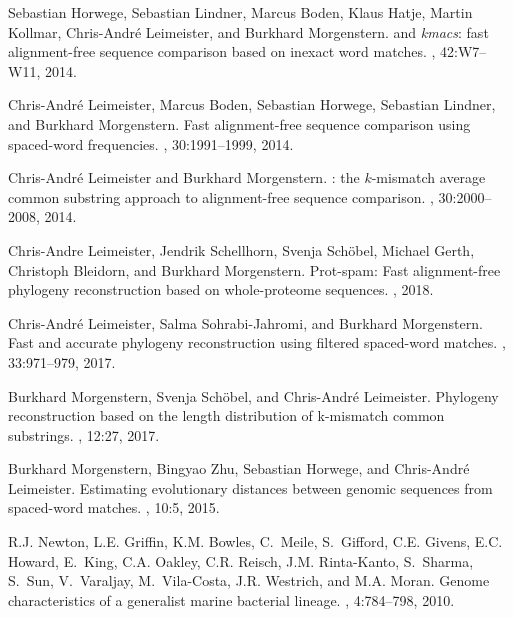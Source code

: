 \documentclass[review]{elsarticle}
\begin{document}
{\begin{thebibliography}{10}
Sebastian Horwege, Sebastian Lindner, Marcus Boden, Klaus Hatje, Martin
  Kollmar, Chris-Andr\'{e} Leimeister, and Burkhard Morgenstern.
 and {\it kmacs}: fast alignment-free sequence
  comparison based on inexact word matches.
, 42:W7--W11, 2014.

Chris-Andr{\'e} Leimeister, Marcus Boden, Sebastian Horwege, Sebastian Lindner,
  and Burkhard Morgenstern.
\newblock Fast alignment-free sequence comparison using spaced-word
  frequencies.
, 30:1991--1999, 2014.

Chris-Andr{\'e} Leimeister and Burkhard Morgenstern.
: the $k$-mismatch average common substring approach to
  alignment-free sequence comparison.
, 30:2000--2008, 2014.

Chris-Andre Leimeister, Jendrik Schellhorn, Svenja Sch{\"o}bel, Michael Gerth,
  Christoph Bleidorn, and Burkhard Morgenstern.
\newblock Prot-spam: Fast alignment-free phylogeny reconstruction based on
  whole-proteome sequences.
, 2018.

Chris-Andr{\'e} Leimeister, Salma Sohrabi-Jahromi, and Burkhard Morgenstern.
\newblock Fast and accurate phylogeny reconstruction using filtered spaced-word
  matches.
, 33:971--979, 2017.

Burkhard Morgenstern, Svenja Sch{\"o}bel, and Chris-Andr{\'e} Leimeister.
\newblock Phylogeny reconstruction based on the length distribution of
  k-mismatch common substrings.
, 12:27, 2017.

Burkhard Morgenstern, Bingyao Zhu, Sebastian Horwege, and Chris-Andr{\'e}
  Leimeister.
\newblock Estimating evolutionary distances between genomic sequences from
  spaced-word matches.
, 10:5, 2015.

R.J. Newton, L.E. Griffin, K.M. Bowles, C.~Meile, S.~Gifford, C.E. Givens, E.C.
  Howard, E.~King, C.A. Oakley, C.R. Reisch, J.M. Rinta-Kanto, S.~Sharma,
  S.~Sun, V.~Varaljay, M.~Vila-Costa, J.R. Westrich, and M.A. Moran.
\newblock Genome characteristics of a generalist marine bacterial lineage.
, 4:784--798, 2010.


\end{thebibliography}}
\end{document}
